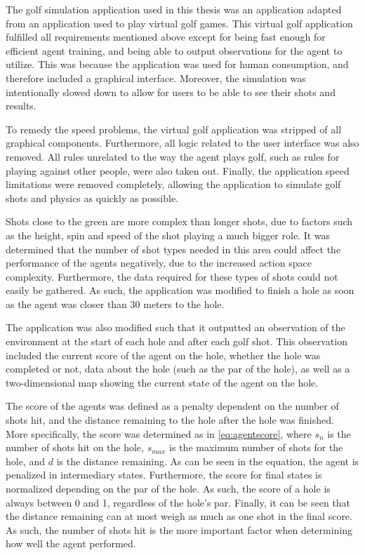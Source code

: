 \documentclass{kththesis}
\begin{document}
The golf simulation application used in this thesis was an application adapted from an application used to play virtual golf games. This virtual golf application fulfilled all requirements mentioned above except for being fast enough for efficient agent training, and being able to output observations for the agent to utilize. This was because the application was used for human consumption, and therefore included a graphical interface. Moreover, the simulation was intentionally slowed down to allow for users to be able to see their shots and results. 

To remedy the speed problems, the virtual golf application was stripped of all graphical components. Furthermore, all logic related to the user interface was also removed. All rules unrelated to the way the agent plays golf, such as rules for playing against other people, were also taken out. Finally, the application speed limitations were removed completely, allowing the application to simulate golf shots and physics as quickly as possible.

Shots close to the green are more complex than longer shots, due to factors such as the height, spin and speed of the shot playing a much bigger role. It was determined that the number of shot types needed in this area could affect the performance of the agents negatively, due to the increased action space complexity. Furthermore, the data required for these types of shots could not easily be gathered. As such, the application was modified to finish a hole as soon as the agent was closer than 30 meters to the hole.

The application was also modified such that it outputted an observation of the environment at the start of each hole and after each golf shot. This observation included the current score of the agent on the hole, whether the hole was completed or not, data about the hole (such as the par of the hole), as well as a two-dimensional map showing the current state of the agent on the hole.

The score of the agents was defined as a penalty dependent on the number of shots hit, and the distance remaining to the hole after the hole was finished. More specifically, the score was determined as in \autoref{eq:agentscore}, where $s_n$ is the number of shots hit on the hole, $s_{max}$ is the maximum number of shots for the hole, and $d$ is the distance remaining. As can be seen in the equation, the agent is penalized in intermediary states. Furthermore, the score for final states is normalized depending on the par of the hole. As such, the score of a hole is always between 0 and 1, regardless of the hole's par. Finally, it can be seen that the distance remaining can at most weigh as much as one shot in the final score. As such, the number of shots hit is the more important factor when determining how well the agent performed. 
\end{document}
